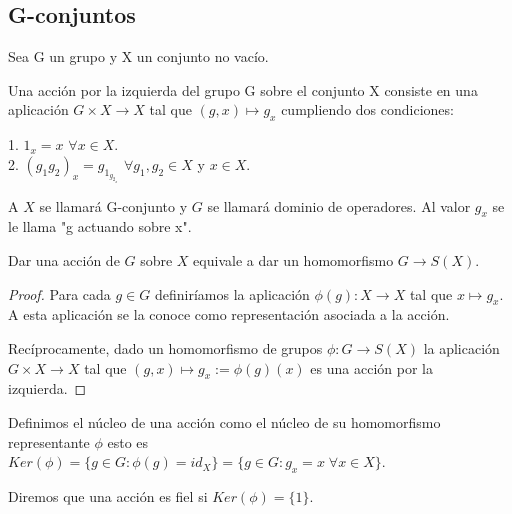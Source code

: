 \subsection{G-conjuntos}

\begin{ndef}
Sea G un grupo y X un conjunto no vacío.

Una acción por la izquierda del grupo G sobre el conjunto X consiste en una aplicación $G \times X \rightarrow X$ tal que $(g,x) \mapsto g_x$ cumpliendo dos condiciones:

1. $1_x = x$ $\forall x \in X$.\\
2. $(g_1g_2)_x = g_{1_{g_{2_x}}}$ $\forall g_1,g_2 \in X$ y $x \in X$.

A $X$ se llamará G-conjunto y $G$ se llamará dominio de operadores. Al valor $g_x$ se le llama "g actuando sobre x". 
\end{ndef}

\begin{nprop}
Dar una acción de $G$ sobre $X$ equivale a dar un homomorfismo $G \rightarrow S(X)$.
\end{nprop}
\begin{proof}
Para cada $g \in G$ definiríamos la aplicación $\phi(g):X \rightarrow X$ tal que $x \mapsto g_x$. A esta aplicación se la conoce como representación asociada a la acción.

Recíprocamente, dado un homomorfismo de grupos $\phi:G \rightarrow S(X)$ la aplicación $G \times X \rightarrow X$ tal que $(g,x) \mapsto g_x:= \phi(g)(x)$ es una acción por la izquierda.
\end{proof}

\begin{ndef}
Definimos el núcleo de una acción como el núcleo de su homomorfismo representante $\phi$ esto es $Ker(\phi) = \{g \in G: \phi(g) = id_X\} = \{g \in G:g_x = x \; \forall x \in X\}$.

Diremos que una acción es fiel si $Ker(\phi) = \{1\}$.
\end{ndef}

